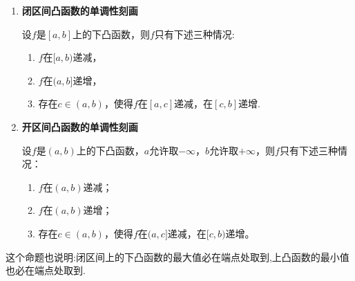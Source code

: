 \documentclass[../../main.tex]{subfiles}%
\begin{document}
\begin{proposition}[下凸函数的单调性刻画]\label{proposition:下凸函数的单调性刻画}
\begin{enumerate}
\item \textbf{闭区间凸函数的单调性刻画}

设\(f\)是\([a,b]\)上的下凸函数，则\(f\)只有下述三种情况:
\begin{enumerate}[(1)]
\item \(f\)在\([a,b)\)递减，

\item \(f\)在\((a,b]\)递增，

\item 存在\(c\in(a,b)\)，使得\(f\)在\([a,c]\)递减，在\([c,b]\)递增.
\end{enumerate}

\item \textbf{开区间凸函数的单调性刻画}

设\(f\)是\((a,b)\)上的下凸函数，\(a\)允许取\(-\infty\)，\(b\)允许取\(+\infty\)，则\(f\)只有下述三种情况：
\begin{enumerate}[(1)]
\item \(f\)在\((a,b)\)递减；
\item \(f\)在\((a,b)\)递增；
\item 存在\(c\in(a,b)\)，使得\(f\)在\((a,c]\)递减，在\([c,b)\)递增。
\end{enumerate}
\end{enumerate}
\end{proposition}
\begin{remark}
这个命题也说明:闭区间上的下凸函数的最大值必在端点处取到,上凸函数的最小值也必在端点处取到.
\end{remark}
\end{document}
